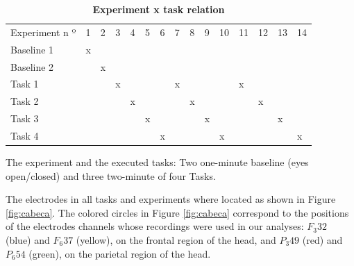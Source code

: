 \documentclass[10pt,letterpaper]{article}
\newlength\savedwidth
\newcommand\thickhline{\noalign{\global\savedwidth\arrayrulewidth\global\arrayrulewidth 2pt}%
\hline
\noalign{\global\arrayrulewidth\savedwidth}}
\begin{document}
\begin{table}[!ht]
  \centering
  \caption{
  {\bf Experiment x task relation}}

    \begin{tabular}{|l|l|l|l|l|l|l|l|l|l|l|l|l|l|l|}
    \hline
    Experiment n º & 1 & 2 & 3 & 4 & 5 & 6 & 7 & 8 & 9 & 10 & 11 & 12 & 13 & 14 \\ \thickhline
    Baseline 1     & x &   &   &   &   &   &   &   &   &    &    &    &    &    \\ \hline
    Baseline 2     &   & x &   &   &   &   &   &   &   &    &    &    &    &    \\ \hline
    Task 1         &   &   & x &   &   &   & x &   &   &    & x  &    &    &    \\ \hline
    Task 2         &   &   &   & x &   &   &   & x &   &    &    & x  &    &    \\ \hline
    Task 3         &   &   &   &   & x &   &   &   & x &    &    &    & x  &    \\ \hline
    Task 4         &   &   &   &   &   & x &   &   &   & x  &    &    &    & x  \\ \hline
    \end{tabular}

  \begin{flushleft} The experiment and the executed tasks: Two one-minute baseline (eyes open/closed) and three two-minute of four Tasks.
  \end{flushleft}
  \label{table1}
  \end{table}

The electrodes in all tasks and experiments where located as shown in Figure \ref{fig:cabeca}. The colored circles in Figure \ref{fig:cabeca} correspond to the positions of the electrodes channels whose recordings were used in our analyses: \(F_{3}32\) (blue) and \(F_{6}37\) (yellow), on the frontal region of the head, and \(P_{3}49\) (red) and \(P_{6}54\) (green), on the parietal region of the head.
\end{document}
